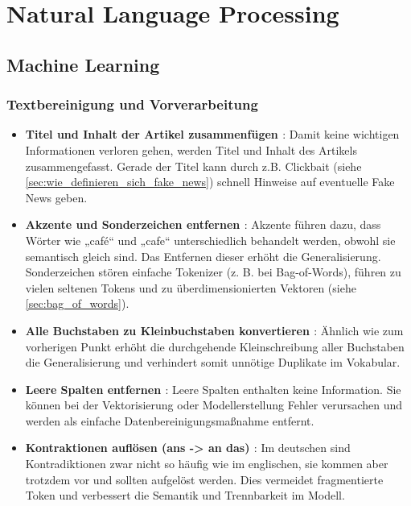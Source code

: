 \chapter{Natural Language Processing}
\label{chap:nlp}

\section{Machine Learning}
\label{sec:ml}

\subsection{Textbereinigung und Vorverarbeitung}
\label{sec:text_vorverarbeitung}

\begin{itemize}
    \item \textbf{Titel und Inhalt der Artikel zusammenfügen \cite{Buddhadev2025}}: Damit keine wichtigen Informationen verloren gehen,
    werden Titel und Inhalt des Artikels zusammengefasst. Gerade der Titel kann durch z.B. Clickbait (siehe \ref{sec:wie_definieren_sich_fake_news})
    schnell Hinweise auf eventuelle Fake News geben.

    \item \textbf{Akzente und Sonderzeichen entfernen \cite{Buddhadev2025} \cite{sabir2025} \cite{aslam2022}}: Akzente führen dazu, dass Wörter wie „café“ und „cafe“ unterschiedlich behandelt werden, 
    obwohl sie semantisch gleich sind. Das Entfernen dieser erhöht die Generalisierung. Sonderzeichen stören einfache Tokenizer (z. B. bei Bag-of-Words), führen zu vielen seltenen Tokens und zu 
    überdimensionierten Vektoren (siehe \ref{sec:bag_of_words}).

    \item \textbf{Alle Buchstaben zu Kleinbuchstaben konvertieren \cite{sabir2025} \cite{SUDHAKAR2024101028} \cite{aslam2022}}: Ähnlich wie zum vorherigen Punkt
    erhöht die durchgehende Kleinschreibung aller Buchstaben die Generalisierung und verhindert somit unnötige Duplikate im Vokabular.

    \item \textbf{Leere Spalten entfernen \cite{SUDHAKAR2024101028}}: Leere Spalten enthalten keine Information. 
    Sie können bei der Vektorisierung oder Modellerstellung Fehler verursachen und werden als einfache Datenbereinigungsmaßnahme entfernt.

    \item \textbf{Kontraktionen auflösen (ans -> an das) \cite{Buddhadev2025}}: Im deutschen sind Kontradiktionen zwar nicht so häufig wie im englischen,
    sie kommen aber trotzdem vor und sollten aufgelöst werden. Dies vermeidet fragmentierte Token und verbessert die Semantik und Trennbarkeit im Modell.


\end{itemize}
